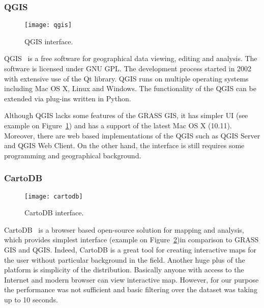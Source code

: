 \subsubsection{QGIS}

\begin{figure}[ht]
  {\par\centering
  \texttt{[image: qgis]}
  \par}
  \caption{QGIS interface.}
  \label{pic:qgis}
\end{figure}

QGIS~\cite{qgis} is a free software for geographical data viewing, editing and analysis. The
software is licensed under GNU GPL. The development process started in 2002 with extensive use of
the Qt library. QGIS runs on multiple operating systems including Mac OS X, Linux and Windows. The
functionality of the QGIS can be extended via plug-ins written in Python.

Although QGIS lacks some features of the GRASS GIS, it has simpler UI (see example on
Figure~\ref{pic:qgis}) and has a support of the latest Mac OS X (10.11). Moreover, there are web
based implementations of the QGIS such as QGIS Server and QGIS Web Client. On the other hand, the
interface is still requires some programming and geographical background.

\subsubsection{CartoDB}

\begin{figure}[ht]
  {\par\centering
  \texttt{[image: cartodb]}
  \par}
  \caption{CartoDB interface.}
  \label{pic:cartodb}
\end{figure}

CartoDB~\cite{cartodb} is a browser based open-source solution for mapping and analysis, which
provides simplest interface (example on Figure~\ref{pic:cartodb})in comparison to GRASS GIS and
QGIS. Indeed, CartoDB is a great tool for creating interactive maps for the user without particular
background in the field. Another huge plus of the platform is simplicity of the distribution.
Basically anyone with access to the Internet and modern browser can view interactive map. However,
for our purpose the performance was not sufficient and basic filtering over the dataset was taking
up to 10 seconds.

